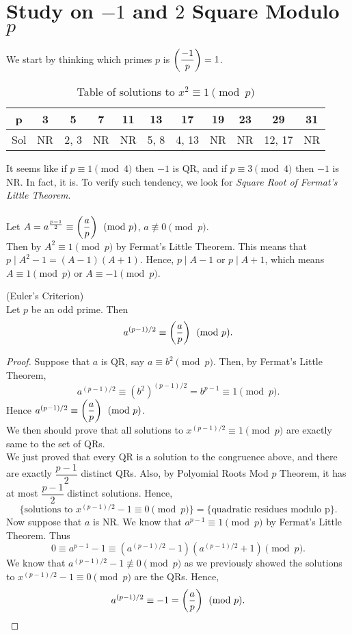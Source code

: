 \section{Study on $-1$ and $2$ Square Modulo $p$}

We start by thinking which primes $p$ is $\left( \dfrac{-1}{p} \right)  = 1$.

\begin{table}[h!]
\centering
\begin{tabular}{|c c c c c c c c c c c|} 
  \hline \hline
  p & 3 & 5 & 7 & 11 & 13 & 17 & 19 & 23 & 29 & 31 \\
  \hline
  Sol & NR & 2, 3 & NR & NR & 5, 8 & 4, 13 & NR & NR & 12, 17 & NR \\ 
  \hline \hline
\end{tabular}
\caption{Table of solutions to $x^{2}\equiv 1\pmod{p}$}
\end{table}

\noindent
It seems like if $p\equiv 1\pmod{4}$ then $-1$ is QR, and if $p\equiv 3\pmod{4}$ then $-1$ is NR. In fact, it is. To verify such tendency, we look for \textit{Square Root of Fermat's Little Theorem}. \\
\\
Let $A = a^{\frac{p - 1}{2}}\equiv \left( \dfrac{a}{p} \right) \pmod{p}$, $a\not\equiv 0\pmod{p}$. \\
Then by $A^{2}\equiv 1\pmod{p}$ by Fermat's Little Theorem. This means that $p\mid A^{2} - 1 = (A - 1)(A + 1)$. Hence, $p\mid A - 1$ or $p\mid A + 1$, which means $A\equiv 1\pmod{p}$ or $A\equiv -1\pmod{p}$.

\begin{theorem}
(Euler's Criterion) \\
Let $p$ be an odd prime. Then \[a^{(p - 1) / 2}\equiv \left( \dfrac{a}{p} \right) \pmod{p}.\]
\end{theorem}

\begin{proof}
Suppose that $a$ is QR, say $a\equiv b^{2}\pmod{p}$. Then, by Fermat's Little Theorem, \[a^{(p - 1) / 2}\equiv (b^{2})^{(p - 1) / 2} = b^{p - 1}\equiv 1\pmod{p}.\] 
Hence $a^{(p - 1) / 2}\equiv \left( \dfrac{a}{p} \right) \pmod{p}$. \\ 
We then should prove that all solutions to $x^{(p - 1) / 2}\equiv 1\pmod{p}$ are exactly same to the set of QRs. \\
We just proved that every QR is a solution to the congruence above, and there are exactly $\dfrac{p - 1}{2}$ distinct QRs. Also, by Polyomial Roots Mod $p$ Theorem, it has at most $\dfrac{p - 1}{2}$ distinct solutions. Hence, \[\{\text{solutions to } x^{(p - 1) / 2} - 1\equiv 0\pmod{p}\} = \{\text{quadratic residues modulo p}\}.\]
Now suppose that $a$ is NR. We know that $a^{p - 1}\equiv 1\pmod{p}$ by Fermat's Little Theorem. Thus \[0\equiv a^{p - 1} - 1\equiv (a^{(p - 1) / 2} - 1)(a^{(p - 1) / 2} + 1)\pmod{p}.\]
We know that $a^{(p - 1) / 2} - 1\not\equiv 0\pmod{p}$ as we previously showed the solutions to $x^{(p - 1) / 2} - 1\equiv 0\pmod{p}$ are the QRs. Hence, \[a^{(p - 1) / 2}\equiv -1 = \left( \dfrac{a}{p} \right) \pmod{p}.\]
\end{proof}

